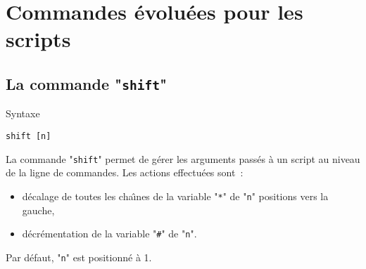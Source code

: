 %
%

\setcounter{remarque-cnt}{1}
\setcounter{example-cnt}{1}
\chapter{Commandes {\'e}volu{\'e}es pour les scripts}

\section{\label{advcmds-shift}La commande "\texttt{shift}"}

\begin{definition}{Syntaxe}
\begin{verbatim}
shift [n]
\end{verbatim}
\end{definition}

La commande "\texttt{shift}" permet de g{\'e}rer les arguments pass{\'e}s {\`a} un
script au niveau de la ligne de commandes. Les actions effectu{\'e}es sont~:
\begin{itemize}
	\item	d{\'e}calage de toutes les cha{\^\i}nes de la variable "\texttt{*}"
			de "\texttt{n}" positions vers la gauche,
	\item	d{\'e}cr{\'e}mentation de la variable "\texttt{\#}" de "\texttt{n}".
\end{itemize}
Par d{\'e}faut, "\texttt{n}" est positionn{\'e} {\`a} 1.

